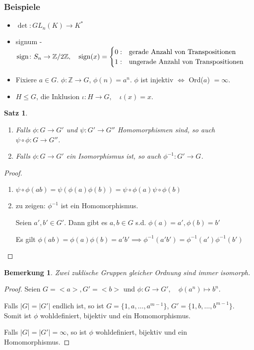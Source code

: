 \documentclass{article}
\theoremstyle{plain}
\newtheorem{theorem}{Satz}
\newtheorem{bemerkung}{Bemerkung}
\newcommand{\Z}{\mathbb{Z}}
\newcommand{\sgn}{\mathrm{sign}}
\newcommand{\zykl}[1]{{<}{#1}{>}}
\begin{document}
\subsubsection*{Beispiele}
\begin{itemize}
    \item $\det\colon GL_n(K)\to K^*$
    \item signum - $\sgn\colon S_n\to\Z/2\Z,\\ \quad \sgn(x) = \begin{cases}
        0: & \text{gerade Anzahl von Transpositionen} \\
        1: & \text{ungerade Anzahl von Transpositionen}
    \end{cases}$
    \item Fixiere $a\in G$. $\phi\colon \Z\to G$, $\phi(n) = a^n$. $\phi$ ist injektiv $\Leftrightarrow$ Ord($a$) $=\infty$.
    \item $H\leq G$, die Inklusion $\iota \colon H\to G,\quad \iota(x)=x$.
\end{itemize}
\begin{theorem}
    \quad
    \begin{enumerate}[label=(\arabic*)]
        \item Falls $\phi\colon G\to G'$ und $\psi\colon G'\to G''$ Homomorphismen sind, so auch $\psi\circ\phi\colon G\to G''$.
        \item Falls $\phi\colon G\to G'$ ein Isomorphismus ist, so auch $\phi^{-1}\colon G'\to G$.
    \end{enumerate}
\end{theorem}
\begin{proof}
    \begin{enumerate}[label=(\arabic*)]
        \item $\psi\circ\phi(ab)=\psi(\phi(a)\phi(b))=\psi\circ\phi(a) \psi\circ\phi(b)$
        \item zu zeigen: $\phi^{-1}$ ist ein Homomorphismus.
        
        Seien $a',b'\in G'$. Dann gibt es $a,b\in G$ s.d. $\phi(a)=a', \phi(b)=b'$

        Es gilt $\phi(ab)=\phi(a)\phi(b)=a'b' \implies \phi^{-1}(a'b')=\phi^{-1}(a')\phi^{-1}(b')$
    \end{enumerate}
\end{proof}

\begin{bemerkung}
    Zwei zuklische Gruppen gleicher Ordnung sind immer isomorph.
\end{bemerkung}
\begin{proof}
    Seien $G=\zykl{a}, G'=\zykl{b}$ und $\phi \colon G\to G', \quad \phi(a^n)\mapsto b^n$.
    
    Falls  $|G|=|G'|$ endlich ist, so ist $G=\{1,a,\ldots,a^{m-1}\}$, $G'=\{1,b,\ldots,b^{m-1}\}$.
    Somit ist $\phi$ wohldefiniert, bijektiv und ein Homomorphismus.

    Falls $|G|=|G'|=\infty$, so ist $\phi$ wohldefiniert, bijektiv und ein Homomorphismus.
\end{proof}
\end{document}
